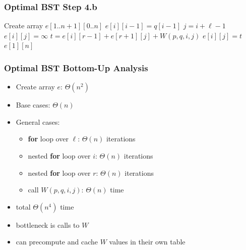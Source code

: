 \documentclass{beamer}
\begin{document}
  \begin{frame} \frametitle{Optimal BST Step 4.b}
    {\footnotesize
    \begin{algorithmic}[1]
      \State Create array $e[1..n+1][0..n]$ 
        \State $e[i][i-1] = q[i-1]$ 
      \EndFor
          \State $j = i + \ell - 1$
          \State $e[i][j] = \infty$
            \State $t = e[i][r-1] + e[r+1][j] + W(p, q, i, j)$
              \State $e[i][j] = t$
            \EndIf
          \EndFor
        \EndFor
      \EndFor
      \State \Return $e[1][n]$
      \EndFunction
    \end{algorithmic}
    }
\end{frame}
  
\begin{frame} \frametitle{Optimal BST Bottom-Up Analysis}
  \begin{itemize}
    \item Create array $e$: $\Theta(n^2)$
    \item Base cases: $\Theta(n)$
    \item General cases:
      \begin{itemize}
        \item \textbf{for} loop over $\ell$: $\Theta(n)$ iterations
        \item nested \textbf{for} loop over $i$: $\Theta(n)$ iterations
        \item nested \textbf{for} loop over $r$: $\Theta(n)$ iterations
        \item call $W(p, q, i, j)$: $\Theta(n)$ time
      \end{itemize}
    \item total $\Theta(n^4)$ time
    \item bottleneck is calls to $W$
    \item can precompute and cache $W$ values in their own table
  \end{itemize}
\end{frame}
\end{document}
